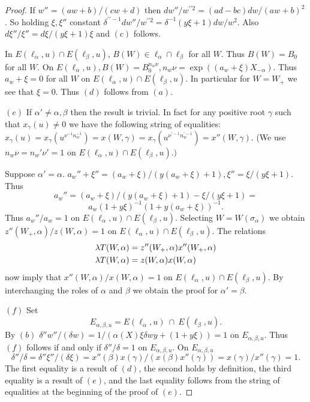 \documentclass{memo-l}
\theoremstyle{definition}
\theoremstyle{remark}
\numberwithin{section}{chapter}
\numberwithin{equation}{chapter}
\begin{document}
\begin{proof}
   If $w'' = (aw+b)/(cw+d)$ then $dw''/w^{\prime\prime2} = (ad-bc)dw/(aw+b)^{2}$.  So
holding ${\xi},{\xi}''$ constant ${\delta}^{\prime\prime-1}dw''/w^{\prime\prime2} =
{\delta}^{-1}(y{\xi}+1)dw/w^{2}$.  Also $d{\xi}''/{\xi}'' =
d{\xi}/(y{\xi}+1){\xi}$ and $(c)$ follows.

\smallskip
   In $E({\ell}_{{\alpha}},u) \cap E({\ell}_{{\beta}},u)$, $B(W)  \in 
{\ell}_{{\alpha}} \cap {\ell}_{{\beta}}$ for all $W$.  Thus $B(W) =
B_{0}$ for all $W$.  On $E({\ell}_{{\alpha}},u), B(W) = 
B_{0}^{n_w{\nu}}, n_{w}{\nu} = \exp((a_{w}+{\xi})X_{-{\alpha}})$.  Thus
$a_{w} + {\xi} = 0$ for all $W$ on $E({\ell}_{{\alpha}},u) \cap
E({\ell}_{{\beta}},u)$.  In particular for $W = W_{+}$ we see that ${\xi} =
0$.  Thus $(d)$ follows from $(a)$.

\smallskip
   $(e)$ If ${\alpha}' \ne {\alpha}, {\beta}$ then the result is trivial.
In fact for any positive root ${\gamma}$ such that $x_{{\gamma}}(u) \ne 0$
we have the following string of equalities: $x_{{\gamma}}(u) =
x_{{\gamma}}(u^{\nu^{-1}n_{w}^{-1}}) = x(W,{\gamma}) =
x_{{\gamma}}(u^{\nu^{\prime-1}n_{w}^{\prime-1}}) = x''(W,{\gamma})$.  (We use
$n_{w}{\nu} = n_{w}'{\nu}' = 1$ on $E({\ell}_{{\alpha}},u) \cap
E({\ell}_{{\beta}},u).)$

   Suppose ${\alpha}' = {\alpha}$.  $a_{w}''+{\xi}'' =
(a_{w}+{\xi})/(y(a_{w}+{\xi})+1), {\xi''} = {\xi}/(y{\xi}+1)$.  Thus
$$
a_{w}'' = (a_{w}+{\xi})/(y(a_{w}+{\xi})+1) - {\xi}/(y{\xi}+1) =
$$
$$
a_{w}(1+y{\xi})^{-1}(1+y(a_{w}+{\xi}))^{-1}.
$$
Thus $a_{w}''/a_{w} = 1$ on $E({\ell}_{{\alpha}},u) \cap
E({\ell}_{{\beta}},u)$.  Selecting $W = W({\sigma}_{{\alpha}})$ we obtain
$z''(W_{+},{\alpha})/z(W,{\alpha}) = 1$ on $E({\ell}_{{\alpha}},u) \cap
E({\ell}_{{\beta}},u)$.  The relations
$$
\aligned
{\lambda}T(W,{\alpha}) &= z''(W_{+},{\alpha})x''(W_{+},{\alpha}) \\
{\lambda}T(W,{\alpha}) &= z(W,{\alpha})x(W,{\alpha})
\endaligned
$$
now imply that $x''(W,{\alpha})/x(W,{\alpha}) = 1$ on $E({\ell}_{{\alpha}},u)
\cap E({\ell}_{{\beta}},u)$.  By interchanging the roles of ${\alpha}$
and ${\beta}$ we obtain the proof for ${\alpha}' = {\beta}$.

\smallskip
   $(f)$ Set $$E_{\alpha,\beta,u} = E(\ell_\alpha,u)\ \cap\ 
   E(\ell_\beta,u).$$  By $(b)$ ${\delta}''w''/({\delta}w) =
1/({\alpha}(X){\xi}{\delta}wy+(1+y{\xi})) = 1$ on $E_{\alpha,\beta,u}$.  Thus $(f)$ follows if and only if
${\delta}''/{\delta} = 1$ on $E_{\alpha,\beta,u}$.  On 
$E_{\alpha,\beta,u}$
$$
{\delta}''/{\delta} = {\delta}''{\xi}''/({\delta}{\xi}) =
x''({\beta})x({\gamma})/(x({\beta})x''({\gamma})) = x({\gamma})/x''({\gamma}) =
1.
$$
The first equality is a result of $(d)$, the second holds by definition,
the third equality is a result of $(e)$, and the last equality follows from
the string of equalities at the beginning of the proof of $(e)$.
\end{proof} 
\end{document}
